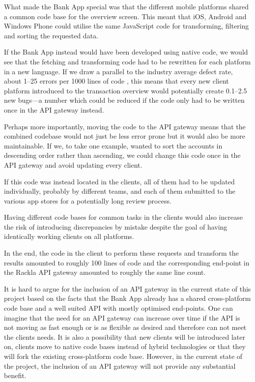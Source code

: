 \documentclass{cslthse-msc}
\begin{document}
What made the Bank App special was that the different mobile platforms shared a common code base for the overview screen. This meant that iOS, Android and Windows Phone could utilise the same JavaScript code for transforming, filtering and sorting the requested data.

If the Bank App instead would have been developed using native code, we would see that the fetching and transforming code had to be rewritten for each platform in a new language. If we draw a parallel to the industry average defect rate, about 1--25 errors per 1000 lines of code \cite[page 521]{code_complete}, this means that every new client platform introduced to the transaction overview would potentially create 0.1--2.5 new bugs---a number which could be reduced if the code only had to be written once in the API gateway instead.

Perhaps more importantly, moving the code to the API gateway means that the combined codebase would not just be less error prone but it would also be more maintainable. If we, to take one example, wanted to sort the accounts in descending order rather than ascending, we could change this code once in the API gateway and avoid updating every client. 

If this code was instead located in the clients, all of them had to be updated individually, probably by different teams, and each of them submitted to the various app stores for a potentially long review process.

Having different code bases for common tasks in the clients would also increase the risk of introducing discrepancies by mistake despite the goal of having identically working clients on all platforms.

In the end, the code in the client to perform these requests and transform the results amounted to roughly 100 lines of code and the corresponding end-point in the Rackla API gateway amounted to roughly the same line count.

It is hard to argue for the inclusion of an API gateway in the current state of this project based on the facts that the Bank App already has a shared cross-platform code base and a well suited API with mostly optimised end-points. One can imagine that the need for an API gateway can increase over time if the API is not moving as fast enough or is as flexible as desired and therefore can not meet the clients needs. It is also a possibility that new clients will be introduced later on, clients move to native code bases instead of hybrid technologies or that they will fork the existing cross-platform code base. However, in the current state of the project, the inclusion of an API gateway will not provide any substantial benefit.
\end{document}
